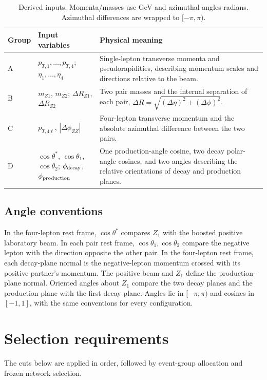 \documentclass[11pt,a4paper]{article}
\begin{document}
\begin{table}[H]
\caption{Derived inputs. Momenta/masses use GeV and azimuthal angles radians. Azimuthal differences are wrapped to $[-\pi,\pi)$.}
\label{tab:features}
\centering\small
\renewcommand{\arraystretch}{1.12}
\begin{tabularx}{\linewidth}{@{}p{.07\linewidth}p{.43\linewidth}Y@{}}
\toprule
Group & Input variables & Physical meaning \\
\midrule
A & $p_{T,1},\ldots,p_{T,4}$; $\eta_1,\ldots,\eta_4$ &
Single-lepton transverse momenta and pseudorapidities, describing momentum scales and directions relative to the beam. \\
B & $m_{Z1}$, $m_{Z2}$; $\Delta R_{Z1}$, $\Delta R_{Z2}$ &
Two pair masses and the internal separation of each pair, $\Delta R=\sqrt{(\Delta\eta)^2+(\Delta\phi)^2}$. \\
C & $p_{T,4\ell}$, $|\Delta\phi_{ZZ}|$ &
Four-lepton transverse momentum and the absolute azimuthal difference between the two pairs. \\
D & $\cos\theta^*$, $\cos\theta_1$, $\cos\theta_2$;
$\phi_{\rm decay}$, $\phi_{\rm production}$ &
One production-angle cosine, two decay polar-angle cosines, and two angles describing the relative orientations of decay and production planes. \\
\bottomrule
\end{tabularx}
\end{table}

\subsection{Angle conventions}
In the four-lepton rest frame, $\cos\theta^*$ compares $Z_1$ with the boosted positive laboratory beam.
In each pair rest frame, $\cos\theta_1,\cos\theta_2$ compare the negative lepton with the direction opposite the other pair.
In the four-lepton rest frame, each decay-plane normal is the negative-lepton momentum crossed with its positive partner's momentum.
The positive beam and $Z_1$ define the production-plane normal.
Oriented angles about $Z_1$ compare the two decay planes and the production plane with the first decay plane.
Angles lie in $[-\pi,\pi)$ and cosines in $[-1,1]$, with the same conventions for every configuration.

\section{Selection requirements}\label{app:cuts}
The cuts below are applied in order, followed by event-group allocation and frozen network selection.
\end{document}
